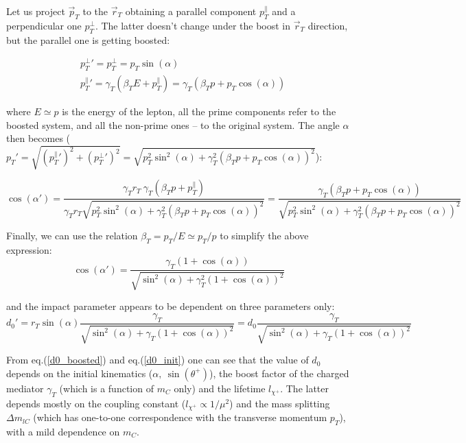 \documentclass[12pt,letterpaper,notitlepage]{article}
\begin{document}
Let us project $\vec{p}_T$ to the $\vec{r}_T$ obtaining a parallel component $p_T^\parallel$ and a perpendicular one $p_T^\bot$. The latter doesn't change under the boost in $\vec{r}_T$ direction, but the parallel one is getting boosted:

\begin{align}
  &p_T^\bot '=p_T^\bot=p_T \sin(\alpha)\\
  &p_T^\parallel '=\gamma_T(\beta_T E+p_T^\parallel)=\gamma_T(\beta_T p+p_T \cos(\alpha))
\end{align}

where $E\simeq p$ is the energy of the lepton, all the prime components refer to the boosted system, and all the non-prime ones -- to the original system. The angle $\alpha$ then becomes ($p_T'=\sqrt{(p_T^\parallel')^2+(p_T^\bot')^2}=\sqrt{p_T^2 \sin^2(\alpha)+\gamma_T^2(\beta_T p+p_T \cos(\alpha))^2}$):

\begin{equation}
  \cos(\alpha')=\frac{\gamma_T r_T\ \gamma_T(\beta_T p+p_T^\parallel)}{\gamma_T r_T \sqrt{p_T^2 \sin^2(\alpha)+\gamma_T^2(\beta_T p+p_T \cos(\alpha))^2}}=\frac{\gamma_T(\beta_T p+p_T \cos(\alpha))}{\sqrt{p_T^2 \sin^2(\alpha)+\gamma_T^2(\beta_T p+p_T \cos(\alpha))^2}}
\end{equation}

Finally, we can use the relation $\beta_T=p_T/E\simeq p_T/p$ to simplify the above expression:
\begin{equation} \label{alpha_boosted}
  \cos(\alpha')=\frac{\gamma_T(1+\cos(\alpha))}{\sqrt{\sin^2(\alpha)+\gamma_T^2(1+ \cos(\alpha))^2}}
\end{equation}

and the impact parameter appears to be dependent on three parameters only:
\begin{equation}\label{d0_boosted}
  d_0'=r_T \sin(\alpha) \frac{\gamma_T}{\sqrt{\sin^2(\alpha)+\gamma_T(1+\cos(\alpha))^2}}= d_0 \frac{\gamma_T}{\sqrt{\sin^2(\alpha)+\gamma_T(1+\cos(\alpha))^2}}
\end{equation}

From eq.(\ref{d0_boosted}) and eq.(\ref{d0_init}) one can see that the value of $d_0$ depends on the initial kinematics ($\alpha,\ \sin(\theta^+)$), the boost factor of the charged mediator $\gamma_T$ (which is a function of $m_C$ only) and the lifetime $l_{\chi^+}$. The latter depends mostly on the coupling constant ($l_{\chi^+} \propto 1/\mu^2$) and the mass splitting $\Delta m_{lC}$ (which has one-to-one correspondence with the transverse momentum $p_T$), with a mild dependence on $m_C$.
\end{document}
